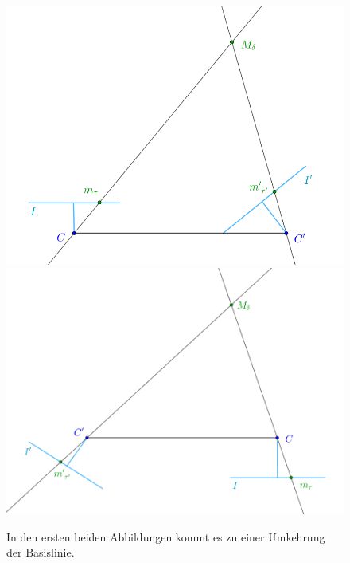 \begin{figure}[!htb]
	\includegraphics[width=\linewidth]{images/P_Solution_one.png}
	\endminipage\hfill
	\includegraphics[width=\linewidth]{images/P_Solution_two.png}
	\endminipage\hfill	
	\caption[Bestimmung extrinsischer Kameraparameter: Lösung eins und zwei]{In den ersten beiden Abbildungen kommt es zu einer Umkehrung der Basislinie.}
	\label{fig:T_1}
\end{figure}
